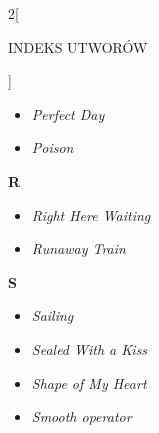 \documentclass[a4paper]{report}
\begin{document}
\begin{multicols*}{2}[\begin{Huge}INDEKS UTWORÓW\end{Huge}\vspace{1cm}]
\begin{minipage}{\columnwidth}
\begin{itemize}[topsep=6pt, after=\vspace{5mm}, leftmargin=0mm]
		\itemsep0em
		\item[]\textit{Perfect Day}  \\
		\item[]  \textit{Poison}  \\
	\end{itemize}
\end{minipage}
\begin{minipage}{\columnwidth}
\begin{Large}
		\textbf{R}
	\end{Large} 
	\begin{itemize}[topsep=6pt, after=\vspace{5mm}, leftmargin=0mm]
		\itemsep0em
		\item[]\textit{Right Here Waiting}  \\
		\item[]  \textit{Runaway Train}  \\
	\end{itemize}
\end{minipage}
\begin{minipage}{\columnwidth}
\begin{Large}
		\textbf{S}
	\end{Large} 
	\begin{itemize}[topsep=6pt, after=\vspace{1.5mm}, leftmargin=0mm]
		\itemsep0em
		\item[]\textit{Sailing}  \\
		\item[]  \textit{Sealed With a Kiss}  \\
	\end{itemize}
\end{minipage}
\begin{minipage}{\columnwidth}
	\begin{itemize}[topsep=6pt, after=\vspace{1.5mm}, leftmargin=0mm]
		\itemsep0em
		\item[]  \textit{Shape of My Heart}  \\
	\end{itemize}
\end{minipage}
\begin{minipage}{\columnwidth}
	\begin{itemize}[topsep=6pt, after=\vspace{1.5mm}, leftmargin=0mm]
		\itemsep0em
		\item[]  \textit{Smooth operator}  \\

\end{itemize}
\end{minipage}
\end{multicols*}
\end{document}
